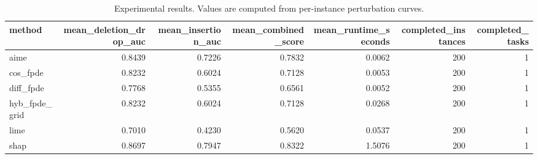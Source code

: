 \begin{table}[t]
\caption{Experimental results. Values are computed from per-instance perturbation curves.}
\label{tab:main_results_computed}
\centering
\begin{tabular}{lrrrrrr}
\toprule
method & mean\_deletion\_drop\_auc & mean\_insertion\_auc & mean\_combined\_score & mean\_runtime\_seconds & completed\_instances & completed\_tasks \\
\midrule
aime & 0.8439 & 0.7226 & 0.7832 & 0.0062 & 200 & 1 \\
cos\_fpde & 0.8232 & 0.6024 & 0.7128 & 0.0053 & 200 & 1 \\
diff\_fpde & 0.7768 & 0.5355 & 0.6561 & 0.0052 & 200 & 1 \\
hyb\_fpde\_grid & 0.8232 & 0.6024 & 0.7128 & 0.0268 & 200 & 1 \\
lime & 0.7010 & 0.4230 & 0.5620 & 0.0537 & 200 & 1 \\
shap & 0.8697 & 0.7947 & 0.8322 & 1.5076 & 200 & 1 \\
\bottomrule
\end{tabular}

\end{table}
